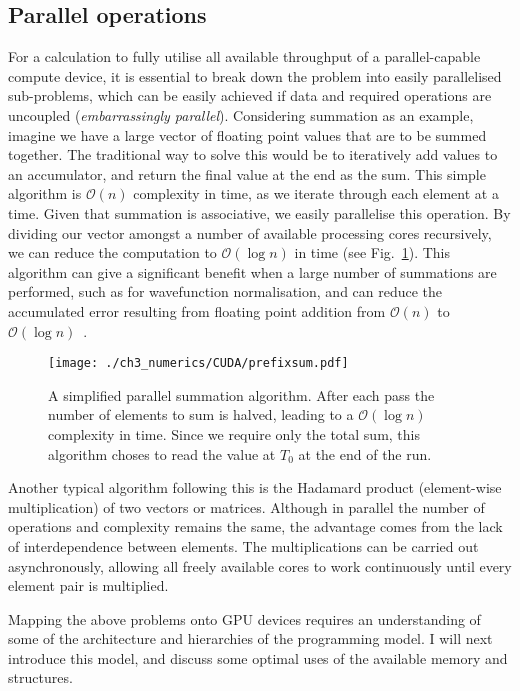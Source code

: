 \subsection{Parallel operations}\label{subsec:par_op}
\label{sub:Parallel operations}
For a calculation to fully utilise all available throughput of a parallel-capable
compute device, it is essential to break down the problem into easily parallelised sub-problems, which can be easily achieved if data and required operations are uncoupled (\textit{embarrassingly parallel}). Considering summation as an example, imagine we have a large vector of floating point values that are to be summed together. The traditional way to solve this would be to iteratively add values to an accumulator, and return the final value at the end as the sum. This simple algorithm is $\mathcal{O}(n)$ complexity in time, as we iterate through each element at a time. Given that summation is associative, we easily parallelise this operation. By dividing our vector amongst a number of available processing cores recursively, we can reduce the computation to $\mathcal{O}(\log{} n)$ in time (see Fig.~\ref{fig:prefixsum}). This algorithm can give a significant benefit when a large number of summations are performed, such as for wavefunction normalisation, and can reduce the accumulated error resulting from floating point addition from $\mathcal{O}(n)$ to $\mathcal{O}(\log{} n)$~\cite{NUM:Higham_siam_1993}.

\begin{figure}
    \centering
    \texttt{[image: ./ch3\_numerics/CUDA/prefixsum.pdf]}
    \caption{A simplified parallel summation algorithm. After each pass the number of elements to sum is halved, leading to a $\mathcal{O}(\log{} n)$ complexity in time. Since we require only the total sum, this algorithm choses to read the value at $T_0$ at the end of the run.}
    \label{fig:prefixsum}
\end{figure}

Another typical algorithm following this is the Hadamard product (element-wise multiplication) of two vectors or matrices. Although in parallel the number of operations and complexity remains the same, the advantage comes from the lack of interdependence between elements. The multiplications can be carried out asynchronously, allowing all freely available cores to work continuously until every element pair is multiplied.


Mapping the above problems onto GPU devices requires an understanding of some of the architecture and hierarchies of the programming model. I will next introduce this model, and discuss some optimal uses of the available memory and structures.


